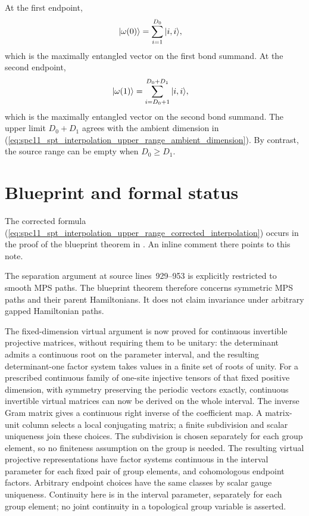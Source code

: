 \documentclass{article}
\begin{document}
At the first endpoint,
\begin{align}
    |\omega(0)\rangle
     & =
    \sum_{i=1}^{D_0}|i,i\rangle,
    \label{eq:spc11_spt_interpolation_upper_range_first_endpoint}
\end{align}
which is the maximally entangled vector on the first bond summand. At the
second endpoint,
\begin{align}
    |\omega(1)\rangle
     & =
    \sum_{i=D_0+1}^{D_0+D_1}|i,i\rangle,
    \label{eq:spc11_spt_interpolation_upper_range_second_endpoint}
\end{align}
which is the maximally entangled vector on the second bond summand. The upper
limit $D_0+D_1$ agrees with the ambient dimension in
(\ref{eq:spc11_spt_interpolation_upper_range_ambient_dimension}). By contrast,
the source range can be empty when $D_0\geq D_1$.

\section{Blueprint and formal status}

The corrected formula
(\ref{eq:spc11_spt_interpolation_upper_range_corrected_interpolation}) occurs in
the proof of the blueprint theorem  in
. An inline
 comment there points to this note.

The separation argument at source lines~929--953 is explicitly restricted to
smooth MPS paths. The blueprint theorem therefore concerns symmetric MPS paths
and their parent Hamiltonians. It does not claim invariance under arbitrary
gapped Hamiltonian paths.

The fixed-dimension virtual argument is now proved for continuous invertible
projective matrices, without requiring them to be unitary: the determinant
admits a continuous root on the parameter interval, and the resulting
determinant-one factor system takes values in a finite set of roots of unity.
For a prescribed continuous family of one-site injective tensors of that
fixed positive dimension, with symmetry preserving the periodic vectors
exactly, continuous invertible virtual matrices can now be derived on the
whole interval. The inverse Gram matrix gives a continuous right inverse
of the coefficient map. A matrix-unit column selects a local conjugating
matrix; a finite subdivision and scalar uniqueness join these choices.
The subdivision is chosen separately for each group element, so no
finiteness assumption on the group is needed. The resulting virtual
projective representations have factor systems continuous in the interval
parameter for each fixed pair of group elements, and cohomologous endpoint
factors. Arbitrary endpoint choices have the same classes by
scalar gauge uniqueness. Continuity here is in the interval parameter,
separately for each group element; no joint continuity in a topological
group variable is asserted.
\end{document}

